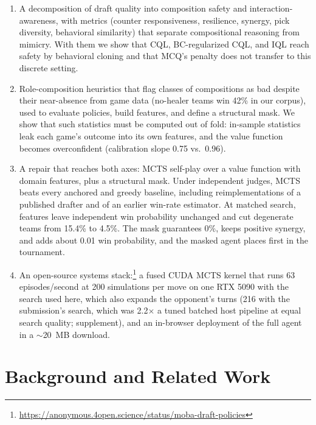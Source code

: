 \documentclass[journal]{IEEEtran}
\newcommand{\repourl}{\url{https://anonymous.4open.science/status/moba-draft-policies}}
\newcommand{\repourl}{\url{https://github.com/maxsegan/moba-draft-policies}}
\begin{document}
\begin{enumerate}
 \item A decomposition of draft quality into composition safety and interaction-awareness, with metrics (counter responsiveness, resilience, synergy, pick diversity, behavioral similarity) that separate compositional reasoning from mimicry. With them we show that CQL, BC-regularized CQL, and IQL reach safety by behavioral cloning and that MCQ's penalty does not transfer to this discrete setting.
 \item Role-composition heuristics that flag classes of compositions as bad despite their near-absence from game data (no-healer teams win 42\% in our corpus), used to evaluate policies, build features, and define a structural mask. We show that such statistics must be computed out of fold: in-sample statistics leak each game's outcome into its own features, and the value function becomes overconfident (calibration slope 0.75 vs.\ 0.96).
 \item A repair that reaches both axes: MCTS self-play over a value function with domain features, plus a structural mask. Under independent judges, MCTS beats every anchored and greedy baseline, including reimplementations of a published drafter and of an earlier win-rate estimator. At matched search, features leave independent win probability unchanged and cut degenerate teams from 15.4\% to 4.5\%. The mask guarantees 0\%, keeps positive synergy, and adds about 0.01 win probability, and the masked agent places first in the tournament.
 \item An open-source systems stack:\footnote{\repourl} a fused CUDA MCTS kernel that runs 63 episodes/second at 200 simulations per move on one RTX 5090 with the search used here, which also expands the opponent's turns (216 with the submission's search, which was 2.2$\times$ a tuned batched host pipeline at equal search quality; supplement), and an in-browser deployment of the full agent in a $\sim$20~MB download.
\end{enumerate}

\section{Background and Related Work}
\end{document}

